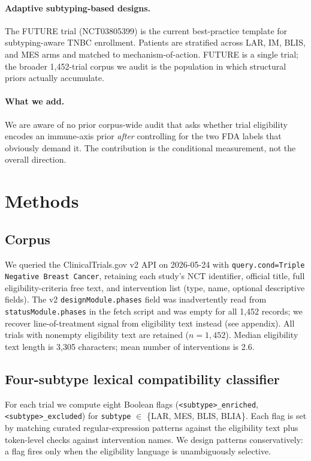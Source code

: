 \documentclass{article}
\begin{document}
\paragraph{Adaptive subtyping-based designs.}
The FUTURE trial (NCT03805399) \cite{hossain2021,subhan2023} is the
current best-practice template for subtyping-aware TNBC enrollment.
Patients are stratified across LAR, IM, BLIS, and MES arms and matched
to mechanism-of-action.  FUTURE is a single trial; the broader
1{,}452-trial corpus we audit is the population in which structural
priors actually accumulate.

\paragraph{What we add.}
We are aware of no prior corpus-wide audit that asks whether trial
eligibility encodes an immune-axis prior \emph{after} controlling for
the two FDA labels that obviously demand it.  The contribution is
the conditional measurement, not the overall direction.

\section{Methods}
\label{sec:methods}

\subsection{Corpus}
We queried the ClinicalTrials.gov v2 API on 2026-05-24 with
\verb|query.cond=Triple Negative Breast Cancer|, retaining each
study's NCT identifier, official title, full eligibility-criteria
free text, and intervention list (type, name, optional descriptive
fields).  The v2 \verb|designModule.phases| field was inadvertently
read from \verb|statusModule.phases| in the fetch script and was
empty for all 1{,}452 records; we recover line-of-treatment signal
from eligibility text instead (see appendix).  All trials with
nonempty eligibility text are retained ($n=1{,}452$).  Median
eligibility text length is 3{,}305 characters; mean number of
interventions is 2.6.

\subsection{Four-subtype lexical compatibility classifier}
For each trial we compute eight Boolean flags
(\verb|<subtype>_enriched|, \verb|<subtype>_excluded|) for
\verb|subtype| $\in$ \{LAR, MES, BLIS, BLIA\}.  Each flag is set by
matching curated regular-expression patterns against the eligibility
text plus token-level checks against intervention names.  We design
patterns conservatively: a flag fires only when the eligibility
language is unambiguously selective.
\end{document}
